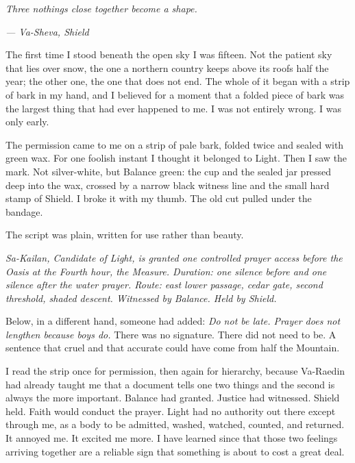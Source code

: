 
\noindent \textit{Three nothings close together become a shape.}\par
\noindent \textit{--- Va-Sheva, Shield}\par

\ornament

\noindent The first time I stood beneath the open sky I was fifteen. Not the patient sky that lies over snow, the one a northern country keeps above its roofs half the year; the other one, the one that does not end. The whole of it began with a strip of bark in my hand, and I believed for a moment that a folded piece of bark was the largest thing that had ever happened to me. I was not entirely wrong. I was only early.\par

\ornament

\noindent The permission came to me on a strip of pale bark, folded twice and sealed with green wax. For one foolish instant I thought it belonged to Light. Then I saw the mark. Not silver-white, but Balance green: the cup and the sealed jar pressed deep into the wax, crossed by a narrow black witness line and the small hard stamp of Shield. I broke it with my thumb. The old cut pulled under the bandage.\par

The script was plain, written for use rather than beauty.\par

\textit{Sa-Kailan, Candidate of Light, is granted one controlled prayer access before the Oasis at the Fourth hour, the Measure. Duration: one silence before and one silence after the water prayer. Route: east lower passage, cedar gate, second threshold, shaded descent. Witnessed by Balance. Held by Shield.}\par

Below, in a different hand, someone had added: \textit{Do not be late. Prayer does not lengthen because boys do.} There was no signature. There did not need to be. A sentence that cruel and that accurate could have come from half the Mountain.\par

I read the strip once for permission, then again for hierarchy, because Va-Raedin had already taught me that a document tells one two things and the second is always the more important. Balance had granted. Justice had witnessed. Shield held. Faith would conduct the prayer. Light had no authority out there except through me, as a body to be admitted, washed, watched, counted, and returned. It annoyed me. It excited me more. I have learned since that those two feelings arriving together are a reliable sign that something is about to cost a great deal.\par

